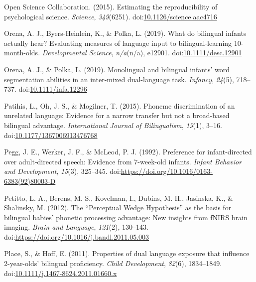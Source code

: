 \documentclass[,man,floatsintext]{apa6}
\begin{document}
\leavevmode\hypertarget{ref-open_science_collab_2015}{}%
Open Science Collaboration. (2015). Estimating the reproducibility of psychological science. \emph{Science}, \emph{349}(6251). doi:\href{https://doi.org/10.1126/science.aac4716}{10.1126/science.aac4716}

\leavevmode\hypertarget{ref-orena_2019}{}%
Orena, A. J., Byers-Heinlein, K., \& Polka, L. (2019). What do bilingual infants actually hear? Evaluating measures of language input to bilingual-learning 10-month-olds. \emph{Developmental Science}, \emph{n/a}(n/a), e12901. doi:\href{https://doi.org/10.1111/desc.12901}{10.1111/desc.12901}

\leavevmode\hypertarget{ref-orena_polka_2019}{}%
Orena, A. J., \& Polka, L. (2019). Monolingual and bilingual infants' word segmentation abilities in an inter-mixed dual-language task. \emph{Infancy}, \emph{24}(5), 718--737. doi:\href{https://doi.org/10.1111/infa.12296}{10.1111/infa.12296}

\leavevmode\hypertarget{ref-patihis_2015}{}%
Patihis, L., Oh, J. S., \& Mogilner, T. (2015). Phoneme discrimination of an unrelated language: Evidence for a narrow transfer but not a broad-based bilingual advantage. \emph{International Journal of Bilingualism}, \emph{19}(1), 3--16. doi:\href{https://doi.org/10.1177/1367006913476768}{10.1177/1367006913476768}

\leavevmode\hypertarget{ref-pegg_1992}{}%
Pegg, J. E., Werker, J. F., \& McLeod, P. J. (1992). Preference for infant-directed over adult-directed speech: Evidence from 7-week-old infants. \emph{Infant Behavior and Development}, \emph{15}(3), 325--345. doi:\href{https://doi.org/https://doi.org/10.1016/0163-6383(92)80003-D}{https://doi.org/10.1016/0163-6383(92)80003-D}

\leavevmode\hypertarget{ref-petitto_2012}{}%
Petitto, L. A., Berens, M. S., Kovelman, I., Dubins, M. H., Jasinska, K., \& Shalinsky, M. (2012). The ``Perceptual Wedge Hypothesis'' as the basis for bilingual babies' phonetic processing advantage: New insights from fNIRS brain imaging. \emph{Brain and Language}, \emph{121}(2), 130--143. doi:\href{https://doi.org/https://doi.org/10.1016/j.bandl.2011.05.003}{https://doi.org/10.1016/j.bandl.2011.05.003}

\leavevmode\hypertarget{ref-place_2011}{}%
Place, S., \& Hoff, E. (2011). Properties of dual language exposure that influence 2-year-olds' bilingual proficiency. \emph{Child Development}, \emph{82}(6), 1834--1849. doi:\href{https://doi.org/10.1111/j.1467-8624.2011.01660.x}{10.1111/j.1467-8624.2011.01660.x}
\end{document}

